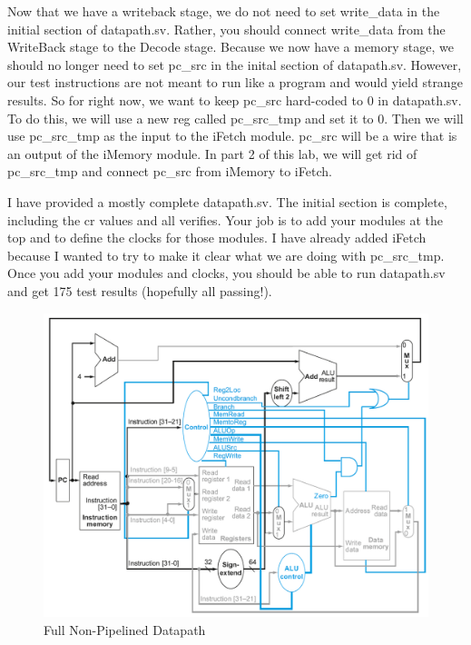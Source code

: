 Now that we have a writeback stage, we do not need to set write\_data in the initial section of datapath.sv.  Rather, you should connect write\_data from the WriteBack stage to the Decode stage.  Because we now have a memory stage, we should no longer need to set pc\_src in the inital section of datapath.sv.  However, our test instructions are not meant to run like a program and would yield strange results.  So for right now, we want to keep pc\_src hard-coded to 0 in datapath.sv.  To do this, we will use a new reg called pc\_src\_tmp and set it to 0.  Then we will use pc\_src\_tmp as the input to the iFetch module.  pc\_src will be a wire that is an output of the iMemory module.  In part 2 of this lab, we will get rid of pc\_src\_tmp and connect pc\_src from iMemory to iFetch.

I have provided a mostly complete datapath.sv.  The initial section is complete, including the cr values and all verifies.  Your job is to add your modules at the top and to define the clocks for those modules.  I have already added iFetch because I wanted to try to make it clear what we are doing with pc\_src\_tmp.  Once you add your modules and clocks, you should be able to run datapath.sv and get 175 test results (hopefully all passing!).

\begin{figure}
\caption{Full Non-Pipelined Datapath}\label{fig:datapath}
\begin{center}
\includegraphics[width=\textwidth]{../images/non_pipelined_datapath.png}
\end{center}
\end{figure}

